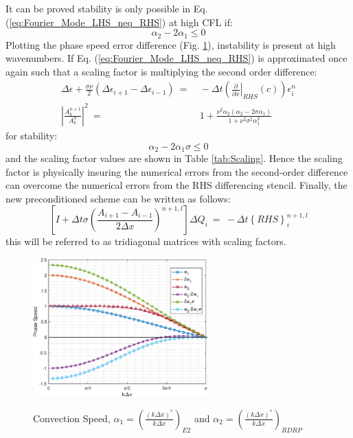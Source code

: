 \documentclass[conf]{new-aiaa}
\begin{document}
It can be proved stability is only possible in Eq. (\ref{eq:Fourier_Mode_LHS_neq_RHS}) at high CFL if:
\begin{equation*}
	\alpha_2-2\alpha_1 \leq 0
\end{equation*}
Plotting the phase speed error difference (Fig. \ref{fig:alpha_stability}), instability is present at high wavenumbers. If Eq. (\ref{eq:Fourier_Mode_LHS_neq_RHS}) is approximated once again such that a scaling factor is multiplying the second order difference:
\begin{equation}
	\begin{split}
		\label{eq:Fourier_Mode_LHS_neq_RHS_Scaling}
   			\Delta{\epsilon}+\frac{\sigma\nu}{2}\left(\Delta{\epsilon_{i+1}}-\Delta{\epsilon_{i-1}} \right)~=&~-\Delta{t}\left(\left.\frac{\partial}{\partial{x}}\right|_{RHS}\left( c \right)\right) {\epsilon}_i^{n} \\
  			\left|\frac{A_k^{n+1}}{A_k^{n}} \right|^2~=&~1+\frac{\nu^2\alpha_2\left(\alpha_2-2\sigma\alpha_1\right)}{1+\nu^2\sigma^2\alpha_1^2}
	\end{split}
\end{equation}
for stability:
\begin{equation*}
	\alpha_2-2\alpha_1\sigma \leq 0
\end{equation*}
and the scaling factor values are shown in Table \ref{tab:Scaling}. Hence the scaling factor is physically insuring the numerical errors from the second-order difference can overcome the numerical errors from the RHS differencing stencil. Finally, the new preconditioned scheme can be written as follows: 
\begin{equation}
	\label{eq:TriDi_NS_Scaling}
  		\left[I+\Delta{t}\sigma\left(\frac{A_{i+1}-A_{i-1}}{2\Delta{x}}\right)^{n+1,l}\right]\Delta{Q}_i~=~-\Delta{t}\left\{RHS\right\}_i^{n+1, l}
\end{equation}
this will be referred to as tridiagonal matrices with scaling factors. 


\begin{figure}[hbt!]
	\centering
	{\includegraphics[width=0.6\textwidth]{Figures/Phase_2alpha_sigma}}
	\caption{Convection Speed, $\alpha_1=\left(\frac{\left(k\Delta{x}\right)^*}{k\Delta{x}} \right)_{E2}$ and $\alpha_2=\left(\frac{\left(k\Delta{x}\right)^*}{k\Delta{x}} \right)_{RDRP}$}
	\label{fig:alpha_stability}
\end{figure}
\end{document}

